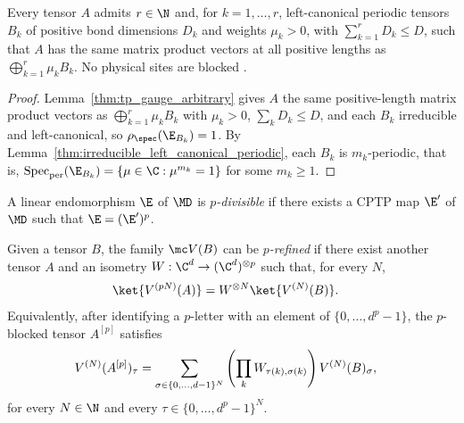 \begin{lemma}
    \label{thm:periodic_positive_decomposition}
    \leanok
    Every tensor $A$ admits $r\in\N$ and, for $k=1,\ldots,r$, left-canonical
    periodic tensors $B_k$ of positive bond dimensions $D_k$ and weights
    $\mu_k>0$, with $\sum_{k=1}^rD_k\le D$, such that $A$ has the same matrix
    product vectors at all positive lengths as $\bigoplus_{k=1}^r\mu_k B_k$.
    No physical sites are blocked
    \cite[lines~238--271 and~313--320]{DeLasCuevas2017Irreducible}.
\end{lemma}

\begin{proof}\leanok
    Lemma~\ref{thm:tp_gauge_arbitrary} gives $A$ the same positive-length
    matrix product vectors as $\bigoplus_{k=1}^r\mu_kB_k$ with $\mu_k>0$,
    $\sum_kD_k\le D$, and each $B_k$ irreducible and left-canonical, so
    $\rho_{\spec}(\E_{B_k})=1$. By
    Lemma~\ref{thm:irreducible_left_canonical_periodic}, each $B_k$ is
    $m_k$-periodic, that is,
    $\operatorname{Spec}_{\mathrm{per}}(\E_{B_k})=\{\mu\in\C:\mu^{m_k}=1\}$
    for some $m_k\ge1$.
\end{proof}

\begin{definition}
    \label{def:p_divisible_channel}
    \leanok
    A linear endomorphism $\E$ of $\MD$ is \emph{$p$-divisible}
    if there exists a CPTP map $\E'$ of $\MD$ such that
    $\E = (\E')^p$.
\end{definition}

\begin{definition}
    \label{def:p_refinable}
    \leanok
    Given a tensor $B$, the family $\mc V(B)$ can be \emph{$p$-refined} if
    there exist another tensor $A$ and an isometry
    $W : \C^d \to (\C^d)^{\otimes p}$ such that, for every $N$,
    \begin{align}
        \ket{V^{(pN)}(A)}
         & = W^{\otimes N}\ket{V^{(N)}(B)}.
        \notag
    \end{align}
    Equivalently, after identifying a $p$-letter with an element of
    $\{0,\ldots,d^p-1\}$, the $p$-blocked tensor $A^{[p]}$ satisfies
    \begin{align}
        V^{(N)}(A^{[p]})_\tau
         & =
        \sum_{\sigma \in \{0,\ldots,d-1\}^N}
        \left(\prod_k W_{\tau(k),\sigma(k)}\right)
        V^{(N)}(B)_\sigma,
        \notag
    \end{align}
    for every $N \in \N$ and every
    $\tau \in \{0,\ldots,d^p-1\}^N$.
\end{definition}

